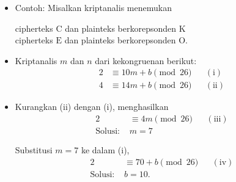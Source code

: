 \documentclass{article}
\begin{document}

\begin{itemize}
    \item Contoh: Misalkan kriptanalis menemukan
    \begin{center}
        cipherteks $\text{C}$ dan plainteks berkorepsonden $\text{K}$ \\
        cipherteks $\text{E}$ dan plainteks berkorepsonden $\text{O}$.
    \end{center}

    \item Kriptanalis $m$ dan $n$ dari kekongruenan berikut:
    \begin{align}
        2 &\equiv 10m + b \pmod{26} && (\text{i}) \\
        4 &\equiv 14m + b \pmod{26} && (\text{ii})
    \end{align}

    \item Kurangkan (ii) dengan (i), menghasilkan
    \begin{align}
        2 &\equiv 4m \pmod{26} && (\text{iii}) \\
        \text{Solusi: } & m = 7
    \end{align}

    Substitusi $m = 7$ ke dalam (i),
    \begin{align}
        2 &\equiv 70 + b \pmod{26} && (\text{iv}) \\
        \text{Solusi: } & b = 10.
    \end{align}
\end{itemize}
\end{document}
